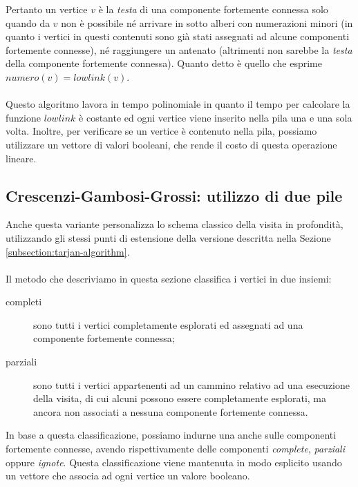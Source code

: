 Pertanto un vertice $v$ \`e la \emph{testa} di una componente
fortemente connessa solo quando da $v$ non \`e possibile n\'e arrivare
in sotto alberi con numerazioni minori (in quanto i vertici in questi
contenuti sono gi\`a stati assegnati ad alcune componenti fortemente
connesse), n\'e raggiungere un antenato (altrimenti non sarebbe la
\emph{testa} della componente fortemente connessa). Quanto detto \`e
quello che esprime $numero(v) = lowlink(v)$.
\\\\
Questo algoritmo lavora in tempo polinomiale in quanto il tempo per
calcolare la funzione $lowlink$ \`e costante ed ogni vertice viene
inserito nella pila una e una sola volta. Inoltre, per verificare se
un vertice \`e contenuto nella pila, possiamo utilizzare un vettore di
valori booleani, che rende il costo di questa operazione lineare.

\subsection{Crescenzi-Gambosi-Grossi: utilizzo di due pile}
\label{subsection:crescenzi-gambosi-grossi}
Anche questa variante personalizza lo schema classico della visita in
profondit\`a, utilizzando gli stessi punti di estensione della
versione descritta nella Sezione \ref{subsection:tarjan-algorithm}.
\\\\
Il metodo che descriviamo in questa sezione classifica i vertici in
due insiemi:
\begin{description}
\item[completi] sono tutti i vertici completamente esplorati ed
  assegnati ad una componente fortemente connessa;
\item[parziali] sono tutti i vertici appartenenti ad un cammino
  relativo ad una esecuzione della visita, di cui alcuni possono
  essere completamente esplorati, ma ancora non associati a nessuna
  componente fortemente connessa.
\end{description}
In base a questa classificazione, possiamo indurne una anche sulle
componenti fortemente connesse, avendo rispettivamente delle
componenti \emph{complete}, \emph{parziali} oppure
\emph{ignote}. Questa classificazione viene mantenuta in modo
esplicito usando un vettore che associa ad ogni vertice un valore
booleano. 

